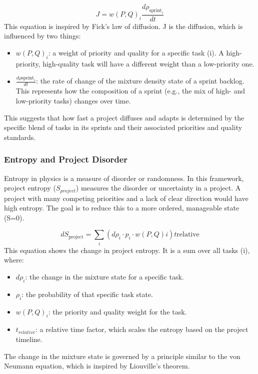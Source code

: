 \documentclass{article}
\begin{document}
\begin{equation}
J = w(P, Q)_i \frac{d \rho_{\text{sprint}_i}}{dt}
\end{equation}
This equation is inspired by Fick's law of diffusion. J is the diffusion, which is influenced by two things:
\begin{itemize}
\item $w(P,Q)_i$: a weight of priority and quality for a specific task (i). A high-priority, high-quality task will have a different weight than a low-priority one.
\item $\frac{d \rho{\text{sprint}_i}}{dt}$: the rate of change of the mixture density state of a sprint backlog. This represents how the composition of a sprint (e.g., the mix of high- and low-priority tasks) changes over time.
\end{itemize}
This suggests that how fast a project diffuses and adapts is determined by the specific blend of tasks in its sprints and their associated priorities and quality standards.

\subsubsection*{Entropy and Project Disorder}
Entropy in physics is a measure of disorder or randomness. In this framework, project entropy ($S_{project}$) measures the disorder or uncertainty in a project. A project with many competing priorities and a lack of clear direction would have high entropy. The goal is to reduce this to a more ordered, manageable state (S=0).

\begin{equation}
dS_{\text{project}} = \sum_i (d\rho_i \cdot p_i \cdot w(P, Q)i) t{\text{relative}}
\end{equation}
This equation shows the change in project entropy. It is a sum over all tasks (i), where:
\begin{itemize}
\item $d\rho_i$: the change in the mixture state for a specific task.
\item $\rho_i$: the probability of that specific task state.
\item $w(P,Q)_i$: the priority and quality weight for the task.
\item $t_{relative}$: a relative time factor, which scales the entropy based on the project timeline.
\end{itemize}
The change in the mixture state is governed by a principle similar to the von Neumann equation, which is inspired by Liouville's theorem.
\end{document}

